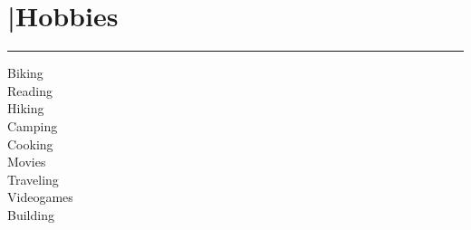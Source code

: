 \section{\textcolor{gold}{\faMale}|Hobbies}
\noindent\color{blue}\rule{12.5cm}{0.4pt}

\noindent
    \faBicycle \space Biking\\
    \faBook \space Reading\\
    \faCompass \space Hiking\\
    \faTree \space Camping\\
    \faCutlery \space Cooking\\
    \faFilm \space Movies\\
    \faGlobe \space Traveling\\
    \faSteamSquare \space Videogames\\
    \faWrench \space Building\\
